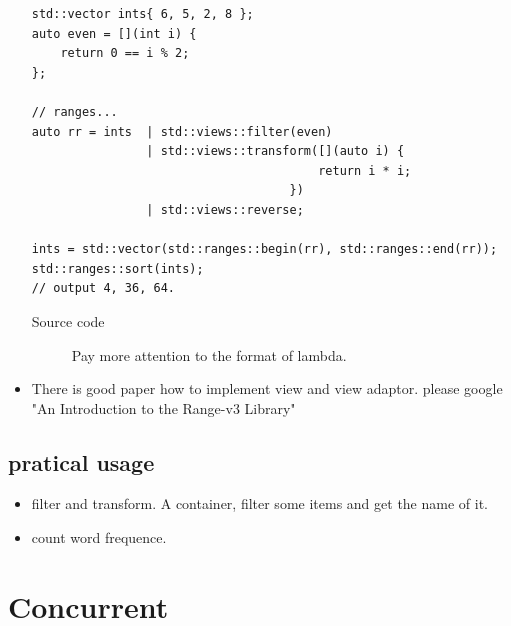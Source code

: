 \documentclass[a4paper,11pt,twoside]{book}
\begin{document}
\begin{itemize}
\begin{lstlisting}
std::vector ints{ 6, 5, 2, 8 };
auto even = [](int i) {
	return 0 == i % 2;
};

// ranges...
auto rr = ints  | std::views::filter(even) 
				| std::views::transform([](auto i) {
										return i * i;
									})
				| std::views::reverse;

ints = std::vector(std::ranges::begin(rr), std::ranges::end(rr));
std::ranges::sort(ints);
// output 4, 36, 64.
\end{lstlisting}	
\begin{description}
	\item[Source code] Pay more attention to the format of lambda.
\end{description}

\item There is good paper how to implement view and view adaptor. please google "An Introduction to the Range-v3 Library"



\end{itemize}

\section{pratical usage}
\begin{itemize}
\item filter and transform. A container, filter some items and get the name of it.
\item count word frequence. 
\end{itemize}


\chapter{Concurrent}
\end{document}
